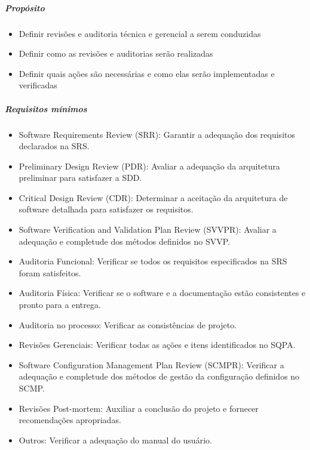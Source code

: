 \begin{itemize}
\subparagraph{Propósito}

\begin{itemize}

\item Definir revisões e auditoria técnica e gerencial a serem conduzidas

\item Definir como as revisões e auditorias serão realizadas

\item Definir quais ações são necessárias e como elas serão implementadas e verificadas

\end{itemize}

\subparagraph{Requisitos mínimos}

\begin{itemize}

\item Software Requirements Review (SRR): Garantir a adequação dos requisitos declarados na SRS.

\item Preliminary Design Review (PDR): Avaliar a adequação da arquitetura preliminar para satisfazer a SDD.

\item Critical Design Review (CDR): Determinar a aceitação da arquitetura de software detalhada para satisfazer os requisitos.

\item Software Verification and Validation Plan Review (SVVPR): Avaliar a adequação e completude dos métodos definidos no SVVP.

\item Auditoria Funcional: Verificar se todos os requisitos especificados na SRS foram satisfeitos.

\item Auditoria Física: Verificar se o software e a documentação estão consistentes e pronto para a entrega.

\item Auditoria no processo: Verificar as consistências de projeto.

\item Revisões Gerenciais: Verificar todas as ações e itens identificados no SQPA.

\item Software Configuration Management Plan Review (SCMPR): Verificar a adequação e completude dos métodos de gestão da configuração definidos no SCMP.

\item Revisões Post-mortem: Auxiliar a conclusão do projeto e fornecer recomendações apropriadas.

\item Outros: Verificar a adequação do manual do usuário.

\end{itemize}


\end{itemize}

